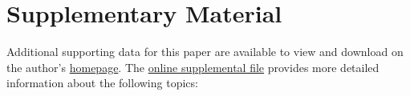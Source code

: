 \documentclass[a4paper, 12pt]{article}
\begin{document}









\newpage
\section*{Supplementary Material} \label{SuppMaterial}




Additional supporting data for this paper are available to view and download on the author’s \href{https://tharcisio-leone.com/}{homepage}. The \href{http://tiny.cc/p8heoz}{online supplemental file} provides more detailed information about the following topics:
\end{document}
